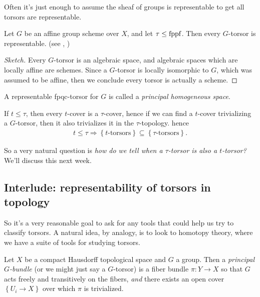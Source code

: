 \documentclass[11pt,openany]{book}
\begin{document}
Often it's just enough to assume the sheaf of groups is representable to get all torsors are representable.

\begin{proposition}\label{prop:affine-gp-torsors-representable} 
Let $G$ be an affine group scheme over $X$, and let $\tau\le \mathrm{fppf}$. Then every $G$-torsor is representable. (see \cite[0497]{Stacks}, \cite[3.25]{Youcis})
\end{proposition}
\begin{proof}[Sketch] Every $G$-torsor is an algebraic space, and algebraic spaces which are locally affine are schemes. Since a $G$-torsor is locally isomorphic to $G$, which was assumed to be affine, then we conclude every torsor is actually a scheme.
\end{proof}


\begin{terminology} A representable fpqc-torsor for $G$ is called a \textit{principal homogeneous space}.
\end{terminology}


\begin{remark} If $t \le \tau$, then every $t$-cover is a $\tau$-cover, hence if we can find a $t$-cover trivializing a $G$-torsor, then it also trivializes it in the $\tau$-topology. hence
\begin{align*}
    t\le \tau \Rightarrow \left\{ t\text{-torsors} \right\} \subseteq \left\{ \tau \text{-torsors} \right\}.
\end{align*}
\end{remark}
So a very natural question is \textit{how do we tell when a $\tau$-torsor is also a $t$-torsor?} We'll discuss this next week.


\subsection{Interlude: representability of torsors in topology}

So it's a very reasonable goal to ask for any tools that could help us try to classify torsors. A natural idea, by analogy, is to look to homotopy theory, where we have a suite of tools for studying torsors.

\begin{definition} Let $X$ be a compact Hausdorff topological space and $G$ a group. Then a \textit{principal $G$-bundle} (or we might just say a $G$-torsor) is a fiber bundle $\pi \colon Y \to X$ so that $G$ acts freely and transitively on the fibers, \textit{and} there exists an open cover $\left\{ U_i \to X \right\}$ over which $\pi$ is trivialized.
\end{definition}
\end{document}
